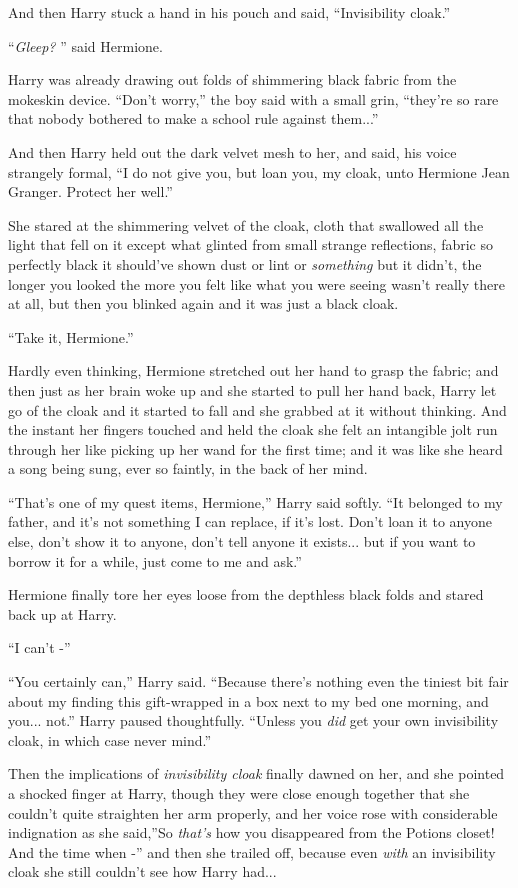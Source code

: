 And then Harry stuck a hand in his pouch and said, ``Invisibility
cloak.''

``\emph{Gleep?} '' said Hermione.

Harry was already drawing out folds of shimmering black fabric from the
mokeskin device. ``Don't worry,'' the boy said with a small grin,
``they're so rare that nobody bothered to make a school rule against
them...''

And then Harry held out the dark velvet mesh to her, and said, his voice
strangely formal, ``I do not give you, but loan you, my cloak, unto
Hermione Jean Granger. Protect her well.''

She stared at the shimmering velvet of the cloak, cloth that swallowed
all the light that fell on it except what glinted from small strange
reflections, fabric so perfectly black it should've shown dust or lint
or \emph{something} but it didn't, the longer you looked the more you
felt like what you were seeing wasn't really there at all, but then you
blinked again and it was just a black cloak.

``Take it, Hermione.''

Hardly even thinking, Hermione stretched out her hand to grasp the
fabric; and then just as her brain woke up and she started to pull her
hand back, Harry let go of the cloak and it started to fall and she
grabbed at it without thinking. And the instant her fingers touched and
held the cloak she felt an intangible jolt run through her like picking
up her wand for the first time; and it was like she heard a song being
sung, ever so faintly, in the back of her mind.

``That's one of my quest items, Hermione,'' Harry said softly. ``It
belonged to my father, and it's not something I can replace, if it's
lost. Don't loan it to anyone else, don't show it to anyone, don't tell
anyone it exists... but if you want to borrow it for a while, just
come to me and ask.''

Hermione finally tore her eyes loose from the depthless black folds and
stared back up at Harry.

``I can't -''

``You certainly can,'' Harry said. ``Because there's nothing even the
tiniest bit fair about my finding this gift-wrapped in a box next to my
bed one morning, and you... not.'' Harry paused thoughtfully.
``Unless you \emph{did} get your own invisibility cloak, in which case
never mind.''

Then the implications of \emph{invisibility cloak} finally dawned on
her, and she pointed a shocked finger at Harry, though they were close
enough together that she couldn't quite straighten her arm properly, and
her voice rose with considerable indignation as she said,''So
\emph{that's} how you disappeared from the Potions closet! And the time
when -'' and then she trailed off, because even \emph{with} an
invisibility cloak she still couldn't see how Harry had...

